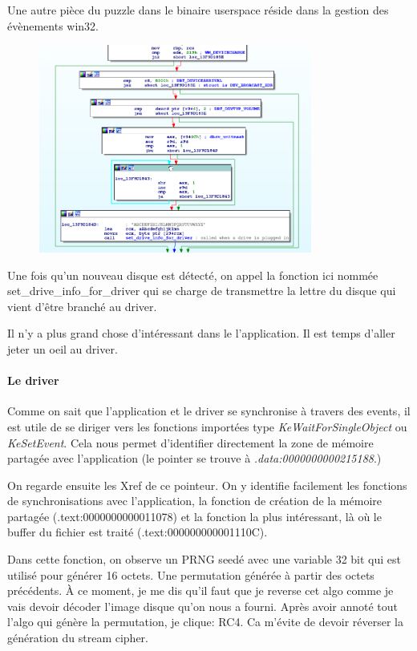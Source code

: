 \documentclass[14pt]{article}
\begin{document}
Une autre pièce du puzzle dans le binaire userspace réside dans la gestion des évènements win32.
\begin{figure}[H]
\includegraphics[width=0.8\textwidth]{./imgs/usb_binary_wait_new_disk.png}
\centering
\end{figure}
Une fois qu'un nouveau disque est détecté, on appel la fonction ici nommée set\_drive\_info\_for\_driver qui se charge de transmettre la lettre du disque qui vient d'être branché au driver.


Il n'y a plus grand chose d'intéressant dans le l'application. Il est temps d'aller jeter un oeil au driver.

\paragraph{Le driver\\ }

Comme on sait que l'application et le driver se synchronise à travers des events, il est utile de se diriger vers les fonctions importées type {\em KeWaitForSingleObject} ou {\em KeSetEvent}. Cela nous permet d'identifier directement la zone de mémoire partagée avec l'application (le pointer se trouve à {\em .data:0000000000215188}.)

On regarde ensuite les Xref de ce pointeur. On y identifie facilement les fonctions de synchronisations avec l'application, la fonction de création de la mémoire partagée (.text:0000000000011078) et la fonction la plus intéressant, là où le buffer du fichier est traité (.text:000000000001110C).

Dans cette fonction, on observe un PRNG seedé avec une variable 32 bit qui est utilisé pour générer 16 octets.
Une permutation générée à partir des octets précédents. À ce moment, je me dis qu'il faut que je reverse cet algo comme je vais devoir décoder l'image disque qu'on nous a fourni. Après avoir annoté tout l'algo qui génère la permutation, je clique: RC4. Ca m'évite de devoir réverser la génération du stream cipher.
\end{document}
